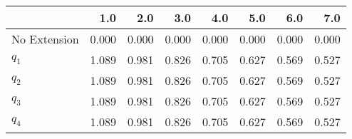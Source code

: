 \begin{tabular}{lrrrrrrr}
\toprule
{} &   1.0 &   2.0 &   3.0 &   4.0 &   5.0 &   6.0 &   7.0 \\
\midrule
No Extension & 0.000 & 0.000 & 0.000 & 0.000 & 0.000 & 0.000 & 0.000 \\
$q_1$        & 1.089 & 0.981 & 0.826 & 0.705 & 0.627 & 0.569 & 0.527 \\
$q_2$        & 1.089 & 0.981 & 0.826 & 0.705 & 0.627 & 0.569 & 0.527 \\
$q_3$        & 1.089 & 0.981 & 0.826 & 0.705 & 0.627 & 0.569 & 0.527 \\
$q_4$        & 1.089 & 0.981 & 0.826 & 0.705 & 0.627 & 0.569 & 0.527 \\
\bottomrule
\end{tabular}
